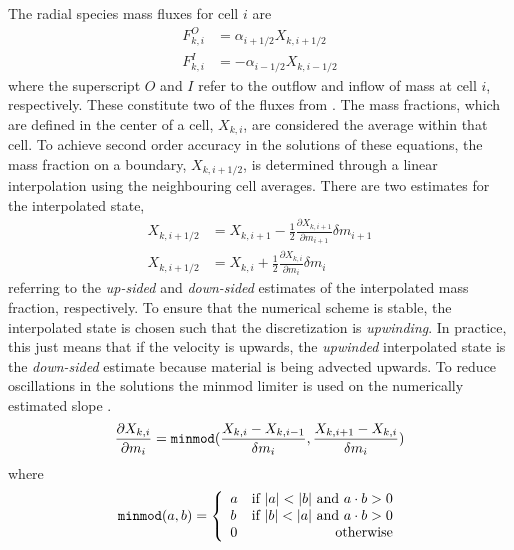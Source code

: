 \documentclass[fleqn,usenatbib]{mnras}
\begin{document}
The radial species mass fluxes for cell $i$ are
%
\begin{subequations}
\label{eq:Rfluxes}
\begin{align}
  F_{k,i}^{O} &= \alpha_{i+1/2} X_{k,i+1/2} \\
  F_{k,i}^{I} &= -\alpha_{i-1/2} X_{k,i-1/2}
\end{align}
\end{subequations}
%
where the superscript $O$ and $I$ refer to the outflow and inflow of mass at
cell $i$, respectively. These constitute two of the fluxes from .
The mass fractions, which are defined in the center of a cell, $X_{k,i}$, are
considered the average within that cell. To
achieve second order accuracy in the solutions of these equations, the mass
fraction on a boundary, $X_{k,i+1/2}$, is determined through a linear
interpolation using the neighbouring cell averages. There are
two estimates for the interpolated state,
%
\begin{subequations}
\begin{align*}
  X_{k,i+1/2} &= X_{k,i+1} - \frac{1}{2}\frac{\partial X_{k,i+1}}{\partial m_{i+1}}\delta m_{i+1} \\
  X_{k,i+1/2} &= X_{k,i} + \frac{1}{2}\frac{\partial X_{k,i}}{\partial m_{i}}\delta m_{i} 
\end{align*}
\end{subequations}
%
referring to the \textit{up-sided} and \textit{down-sided} estimates of the
interpolated mass fraction, respectively. To ensure that the numerical scheme is
stable, the interpolated state is chosen such that the discretization is
\textit{upwinding}. In practice, this just means that if the velocity is
upwards, the \textit{upwinded} interpolated state is the \textit{down-sided}
estimate because material is being advected upwards. To reduce oscillations in
the solutions the minmod limiter is used on the numerically estimated slope
\citep{LeVeque2002FiniteVM}.
%
\begin{equation*}
  \frac{\partial X_{k,i}}{\partial m_{i}} = \texttt{minmod}(\frac{X_{k,i} - X_{k,i-1}}{\delta m_{i}}, \frac{X_{k,i+1} - X_{k,i}}{\delta m_{i}})
\end{equation*}
%
where 
\begin{align*}
  \texttt{minmod}(a,b) = \left\{
  \begin{array}{lr}
      a & \text{if } |a| < |b| \text{ and } a \cdot b > 0 \\
      b & \text{if } |b| < |a| \text{ and } a \cdot b > 0 \\
      0 & \text{otherwise}
  \end{array}
  \right.
\end{align*}
\end{document}
